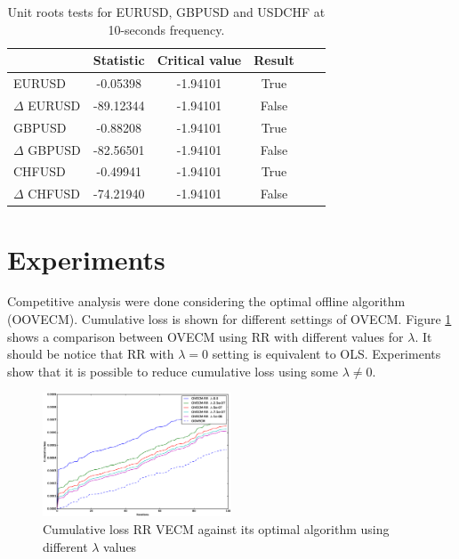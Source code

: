 \documentclass[twocolumn]{svjour3}          %
\begin{document}
\begin{table}[h!]
\label{tab:adf}
\begin{center}
\begin{tabular}{|l|c|c|c|c|c|}
\hline
& \textbf{Statistic} & \textbf{Critical value} & \textbf{Result}\\
\hline
EURUSD          &  -0.05398   & -1.94101 & True       \\
$\Delta$ EURUSD & -89.12344   & -1.94101 & False       \\
GBPUSD          &  -0.88208   & -1.94101 & True          \\
$\Delta$ GBPUSD & -82.56501   & -1.94101 & False       \\
CHFUSD          & -0.49941    & -1.94101 & True         \\
$\Delta$ CHFUSD & -74.21940   & -1.94101 & False       \\
\hline
\end{tabular}
\end{center}
\caption{Unit roots tests for EURUSD, GBPUSD and USDCHF at 10-seconds
frequency.}
\end{table}

\section{Experiments}

Competitive analysis were done considering the optimal offline algorithm (OOVECM). Cumulative loss is shown for different settings of OVECM. Figure \ref{fig:RRcomparison}  shows a comparison between OVECM using RR with different values for $\lambda$. It should be notice that RR with $\lambda = 0$ setting is equivalent to OLS. Experiments show that it is possible to reduce cumulative loss using some $\lambda \neq 0$.

\begin{figure}[!ht]
  \centering
  \includegraphics[width=0.5\textwidth]{RRcomparison}
  \caption{Cumulative loss RR VECM against its optimal algorithm using different $\lambda$ values}
  \label{fig:RRcomparison}
\end{figure}
\end{document}
